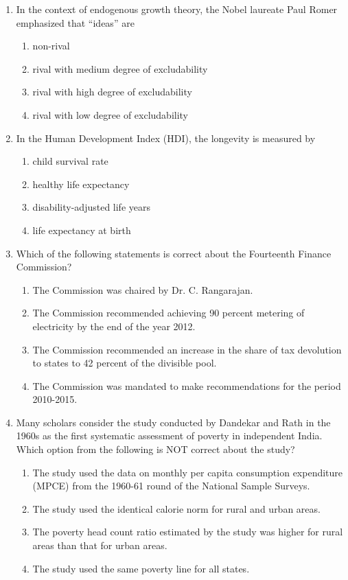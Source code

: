 \documentclass[journal,13pt,onecolumn]{exam}
\theoremstyle{remark}
\begin{document}
\begin{enumerate}[label=Q.\arabic*]
\item In the context of endogenous growth theory, the Nobel laureate Paul Romer emphasized that ``ideas'' are
    \begin{enumerate}[label=\textbf{(\Alph*)}]
        \item non-rival
        \item rival with medium degree of excludability
        \item rival with high degree of excludability
        \item rival with low degree of excludability
    \end{enumerate}
\item In the Human Development Index (HDI), the longevity is measured by
    \begin{enumerate}[label=\textbf{(\Alph*)}]
        \item child survival rate
        \item healthy life expectancy
        \item disability-adjusted life years
        \item life expectancy at birth
    \end{enumerate}

\item Which of the following statements is correct about the Fourteenth Finance Commission?
    \begin{enumerate}[label=\textbf{(\Alph*)}]
        \item The Commission was chaired by Dr. C. Rangarajan.
        \item The Commission recommended achieving 90 percent metering of electricity by the end of the year 2012.
        \item The Commission recommended an increase in the share of tax devolution to states to 42 percent of the divisible pool.
        \item The Commission was mandated to make recommendations for the period 2010-2015.
    \end{enumerate}
\item Many scholars consider the study conducted by Dandekar and Rath in the 1960s as the first systematic assessment of poverty in independent India. Which option from the following is NOT correct about the study?
    \begin{enumerate}[label=\textbf{(\Alph*)}]
        \item The study used the data on monthly per capita consumption expenditure (MPCE) from the 1960-61 round of the National Sample Surveys.
        \item The study used the identical calorie norm for rural and urban areas.
        \item The poverty head count ratio estimated by the study was higher for rural areas than that for urban areas.
        \item The study used the same poverty line for all states.
    \end{enumerate}


\end{enumerate}
\end{document}
